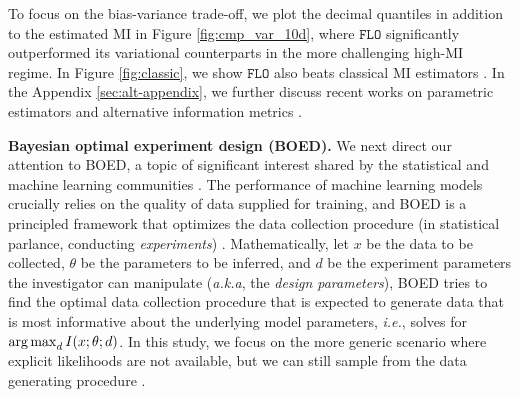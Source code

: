 \documentclass{article}
\theoremstyle{plain}
\theoremstyle{definition}
\theoremstyle{remark}
\newcommand{\FLO}{\texttt{FLO}}
\begin{document}
		To focus on the bias-variance trade-off, we plot the decimal quantiles in addition to the estimated MI in Figure \ref{fig:cmp_var_10d}, where $\FLO$ significantly outperformed its variational counterparts in the more challenging high-MI regime. In Figure \ref{fig:classic}, we show $\FLO$ also beats classical MI estimators \citep{kraskov2004estimating, ver2013information, gao2018demystifying}. In the Appendix \ref{sec:alt-appendix}, we further 
		discuss recent works on parametric estimators \citep{cheng2020club, brekelmans2021improving} and alternative information metrics \citep{xu2020theory}.
		
		
		
		
		
		{\bf Bayesian optimal experiment design (BOED).} We next direct our attention to BOED, a topic of significant interest shared by the statistical and machine learning communities \citep{chaloner1995bayesian, wu2011experiments, hernandez2014predictive, foster2020unified}. The performance of machine learning models crucially relies on the quality of data supplied for training, and BOED is a principled framework that optimizes the data collection procedure (in statistical parlance, conducting {\it experiments}) \citep{foster2019variational}. Mathematically, let $x$ be the data to be collected, $\theta$ be the parameters to be inferred, and $d$ be the experiment parameters the investigator can manipulate ({\it a.k.a}, the {\it design parameters}), BOED tries to find the optimal data collection procedure that is expected to generate data that is most informative about the underlying model parameters, {\it i.e.}, solves for $\operatorname{\arg\max}_{d} I(x;\theta;d)$. In this study, we focus on the more generic scenario where explicit likelihoods are not available, but we can still sample from the data generating procedure \citep{kleinegesse2020bayesian, kleinegesse2021gradient}.
		
\end{document}
